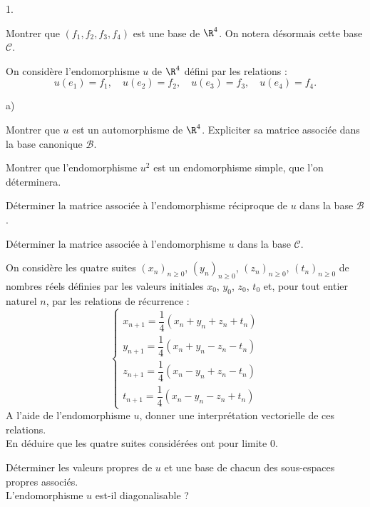 \documentclass[11pt]{article}%
\begin{document}
\begin{noliste}{1.}
 \setlength{\itemsep}{4mm}
\item Montrer que $(f_{1},f_{2},f_{3},f_{4})$ est une base de $\R^{4}$.
On
notera désormais cette base $\mathcal{C}$.

\item On considère l'endomorphisme $u$ de $\R^{4}$ défini par les
relations : 
\[
u\left( e_{1}\right) = f_{1},\quad u\left( e_{2}\right) = f_{2},\quad
u\left(
e_{3}\right) = f_{3},\quad u\left( e_{4}\right) = f_{4}.
\]

\begin{noliste}{a)}
 \setlength{\itemsep}{2mm}
\item Montrer que $u$ est un automorphisme de $\R^{4}$. Expliciter
sa matrice associée dans la base canonique $\mathcal{B}$.

\item Montrer que l'endomorphisme $u^{2}$ est un endomorphisme simple,
que
l'on déterminera.

\item Déterminer la matrice associée à l'endomorphisme réciproque de
$u$
dans la base $\mathcal{B}$.

\item Déterminer la matrice associée à l'endomorphisme $u$ dans la base
$\mathcal{C}$.
\end{noliste}

\item On considère les quatre suites $\left( x_{n}\right)_{n\geq 0}$,
$\left( y_{n}\right)_{n\geq 0}$, $\left( z_{n}\right)_{n\geq 0}$, 
$\left( t_{n}\right)_{n\geq 0}$ de nombres réels définies par les
valeurs initiales $x_{0}$, $y_{0}$, $z_{0}$, $t_{0}$ et, pour tout
entier
naturel $n$, par les relations de récurrence : 
\[
\left\{
\begin{array}{cl}
x_{n + 1} = \dfrac{1}{4}\left( x_{n} + y_{n} + z_{n} + t_{n}\right) \\
y_{n + 1} = \dfrac{1}{4}\left( x_{n} + y_{n}-z_{n}-t_{n}\right) \\
z_{n + 1} = \dfrac{1}{4}\left( x_{n}-y_{n} + z_{n}-t_{n}\right) \\
t_{n + 1} = \dfrac{1}{4}\left( x_{n}-y_{n}-z_{n} + t_{n}\right)
\end{array}
\right.
\]
A l'aide de l'endomorphisme $u$, donner une interprétation vectorielle
de
ces relations. \\
En déduire que les quatre suites considérées ont pour limite $0$.

\item Déterminer les valeurs propres de $u$ et une base de chacun des
sous-espaces propres associés. \\
L'endomorphisme $u$ est-il diagonalisable ?
\end{noliste}
\end{document}
